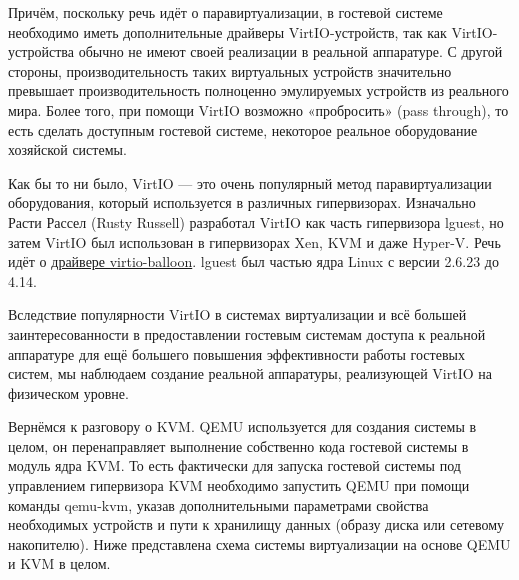 \documentclass[14pt, a4paper]{article}
\begin{document}
Причём, поскольку речь идёт о паравиртуализации, в гостевой системе необходимо иметь
дополнительные драйверы VirtIO-устройств, так как VirtIO-устройства обычно не имеют своей
реализации в реальной аппаратуре. С другой стороны, производительность таких виртуальных
устройств значительно превышает производительность полноценно эмулируемых устройств из
реального мира. Более того, при помощи VirtIO возможно «пробросить» (pass through), то есть
сделать доступным гостевой системе, некоторое реальное оборудование хозяйской системы.

Как бы то ни было, VirtIO — это очень популярный метод паравиртуализации оборудования, который
используется в различных гипервизорах. Изначально Расти Рассел (Rusty Russell) разработал VirtIO
как часть гипервизора lguest, но затем VirtIO был использован в гипервизорах Xen, KVM и даже
Hyper-V. Речь идёт о \href{https://www.opennet.ru/opennews/art.shtml?num=51785}{драйвере virtio-balloon}. lguest был частью ядра Linux с версии 2.6.23 до 4.14.

Вследствие популярности VirtIO в системах виртуализации и всё большей заинтересованности в
предоставлении гостевым системам доступа к реальной аппаратуре для ещё большего повышения
эффективности работы гостевых систем, мы наблюдаем создание реальной аппаратуры,
реализующей VirtIO на физическом уровне.

Вернёмся к разговору о KVM. QEMU используется для создания системы в целом, он перенаправляет
выполнение собственно кода гостевой системы в модуль ядра KVM. То есть фактически для запуска
гостевой системы под управлением гипервизора KVM необходимо запустить QEMU при помощи
команды qemu-kvm, указав дополнительными параметрами свойства необходимых устройств и пути к
хранилищу данных (образу диска или сетевому накопителю). Ниже представлена схема системы
виртуализации на основе QEMU и KVM в целом.\newpage
\end{document}
